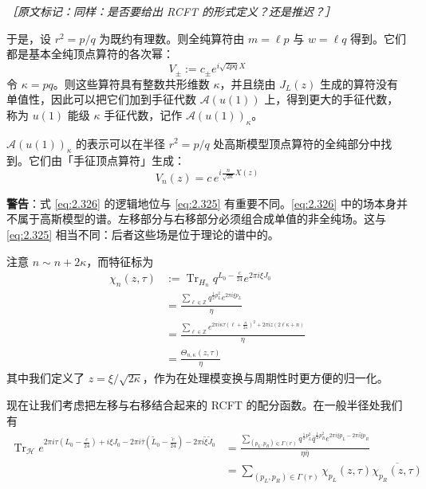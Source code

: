 {\small\itshape ［原文标记：同样：是否要给出 RCFT 的形式定义？还是推迟？］}

于是，设 $r^2=p/q$ 为既约有理数。则全纯算符由 $m=\ell p$ 与 $w=\ell q$ 得到。它们都是基本全纯顶点算符的各次幂：
\begin{equation}
  V_\pm:=c_\pm e^{i\sqrt{2pq}X}
  \tag{2.325}
  \label{eq:2.325}
\end{equation}
令 $\kappa=pq$。则这些算符具有整数共形维数 $\kappa$，并且绕由 $J_L(z)$ 生成的算符没有单值性，因此可以把它们加到手征代数 $\mathcal{A}(u(1))$ 上，得到更大的手征代数，称为 $u(1)$ 能级 $\kappa$ 手征代数，记作 $\mathcal{A}(u(1))_\kappa$。

$\mathcal{A}(u(1))_\kappa$ 的表示可以在半径 $r^2=p/q$ 处高斯模型顶点算符的全纯部分中找到。它们由「手征顶点算符」生成：
\begin{equation}
  V_n(z)=c\,e^{i\frac{n}{\sqrt{2\kappa}}X(z)}
  \tag{2.326}
  \label{eq:2.326}
\end{equation}

\textbf{警告}：式 \eqref{eq:2.326} 的逻辑地位与 \eqref{eq:2.325} 有重要不同。\eqref{eq:2.326} 中的场本身并不属于高斯模型的谱。左移部分与右移部分必须组合成单值的非全纯场。这与 \eqref{eq:2.325} 相当不同：后者这些场是位于理论的谱中的。

注意 $n\sim n+2\kappa$，而特征标为
\begin{equation}
  \begin{aligned}
    \chi_n(z,\tau)&:=\operatorname{Tr}_{H_n}q^{L_0-\frac{c}{24}}e^{2\pi i\xi J_0}\\
    &=\frac{\sum_{\ell\in\mathbb{Z}}q^{\frac12p_L^2}e^{2\pi i\xi p_L}}{\eta}\\
    &=\frac{\sum_{\ell\in\mathbb{Z}}e^{2\pi i\kappa\tau\left(\ell+\frac{n}{2\kappa}\right)^2+2\pi iz(2\ell\kappa+n)}}{\eta}\\
    &=\frac{\Theta_{n,\kappa}(z,\tau)}{\eta}
  \end{aligned}
  \tag{2.327}
  \label{eq:2.327}
\end{equation}
其中我们定义了 $z=\xi/\sqrt{2\kappa}$，作为在处理模变换与周期性时更方便的归一化。

现在让我们考虑把左移与右移结合起来的 RCFT 的配分函数。在一般半径处我们有
\begin{equation}
  \begin{aligned}
    \operatorname{Tr}_{\mathcal{H}}e^{2\pi i\tau(L_0-\frac{c}{24})+i\xi J_0-2\pi i\bar\tau(\tilde L_0-\frac{\tilde c}{24})-2\pi i\tilde\xi\tilde J_0}
    &=\frac{\sum_{(p_L,p_R)\in\Gamma(r)}q^{\frac12p_L^2}\bar q^{\frac12p_R^2}e^{2\pi i\xi p_L-2\pi i\tilde\xi p_R}}{\eta\bar\eta}\\
    &=\sum_{(p_L,p_R)\in\Gamma(r)}\chi_{p_L}(z,\tau)\overline{\chi_{p_R}(z,\tau)}
  \end{aligned}
  \tag{2.328}
  \label{eq:2.328}
\end{equation}

